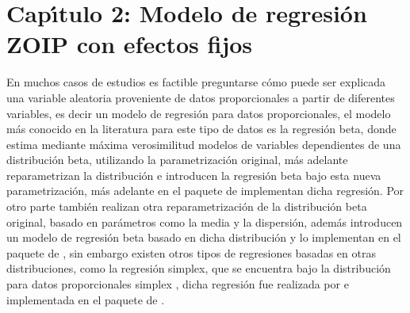 \chapter{Cap\'{\i}tulo 2: Modelo de regresi\'{o}n ZOIP con efectos fijos}

En muchos casos de estudios es factible preguntarse c\'{o}mo puede ser explicada una variable aleatoria proveniente de datos proporcionales a partir de diferentes variables, es decir un modelo de regresi\'{o}n para datos proporcionales, el modelo m\'{a}s conocido en la literatura para este tipo de datos es la regresi\'{o}n beta, donde \cite{Paolino1} estima mediante m\'{a}xima verosimilitud modelos de variables dependientes de una distribuci\'{o}n beta, utilizando la parametrizaci\'{o}n original, m\'{a}s adelante  \cite{Ferrari2} reparametrizan la distribuci\'{o}n e introducen la regresi\'{o}n beta bajo esta nueva parametrizaci\'{o}n, m\'{a}s adelante en el paquete  de  \citep{Zeileis1} implementan dicha regresi\'{o}n. Por otro parte \cite{Stasinopoulos2} tambi\'{e}n realizan otra reparametrizaci\'{o}n de la distribuci\'{o}n beta original, basado en par\'{a}metros como la media y la dispersi\'{o}n, adem\'{a}s introducen un modelo de regresi\'{o}n beta basado en dicha distribuci\'{o}n y lo implementan en el paquete  de , sin embargo existen otros tipos de regresiones basadas en otras distribuciones, como la regresi\'{o}n simplex, que se encuentra bajo la distribuci\'{o}n para datos proporcionales simplex \citep{Barndorff1}, dicha regresi\'{o}n fue realizada por \cite{Qiu1} e implementada en el paquete  de  \citep{Zhang1}.\\

